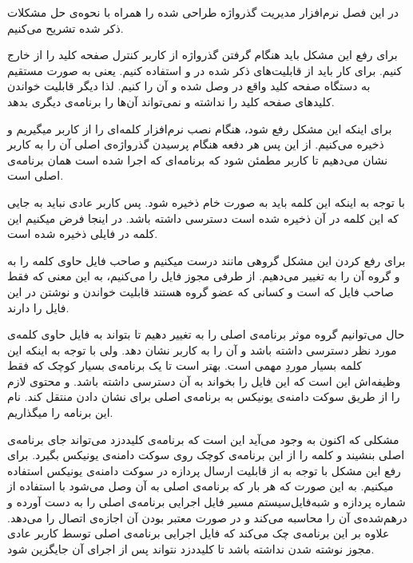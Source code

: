 
در این فصل نرم‌افزار مدیریت گذرواژه طراحی شده را همراه با نحوه‌ی حل مشکلات ذکر شده تشریح می‌کنیم.


برای رفع این مشکل باید هنگام گرفتن گذرواژه از کاربر کنترل صفحه کلید را از  خارج کنیم. برای کار باید از قابلیت‌های ذکر شده در  و   استفاده کنیم. یعنی به صورت مستقیم به دستگاه صفحه کلید واقع در  وصل شده و آن را  کنیم. لذا دیگر  قابلیت خواندن کلید‌های صفحه کلید را نداشته و نمی‌تواند آن‌ها را برنامه‌ی دیگری بدهد.


برای اینکه این مشکل رفع شود، هنگام نصب نرم‌افزار کلمه‌ای را از کاربر میگیریم و ذخیره می‌کنیم. از این پس هر دفعه هنگام پرسیدن گذرواژه‌ی اصلی آن را به کاربر نشان می‌دهیم تا کاربر مطمئن شود که برنامه‌ای که اجرا شده است همان برنامه‌ی اصلی است.

با توجه به اینکه این کلمه باید به صورت خام ذخیره شود. پس کاربر عادی نباید به جایی که این کلمه در آن ذخیره شده است دسترسی داشته باشد. در اینجا فرض میکنیم این کلمه در فایلی ذخیره شده است. 

برای رفع کردن این مشکل گروهی مانند  درست میکنیم و صاحب فایل حاوی کلمه را به  و گروه آن را به  تغییر می‌دهیم. از طرفی مجوز فایل را   می‌کنیم، به این معنی که فقط صاحب فایل که  است و کسانی که عضو گروه  هستند قابلیت خواندن و نوشتن در این فایل را دارند. 

حال می‌توانیم گروه موثر برنامه‌ی اصلی را به  تغییر دهیم تا بتواند به فایل حاوی کلمه‌ی مورد نظر دسترسی داشته باشد و آن را به کاربر نشان دهد. ولی با توجه به اینکه این کلمه بسیار موردِ مهمی است. بهتر است تا یک برنامه‌ی بسیار کوچک که فقط وظیفه‌اش این است که این فایل را بخواند به آن دسترسی داشته باشد. و محتوی لازم را از طریق سوکت دامنه‌ی یونیکس به برنامه‌ی اصلی برای نشان دادن منتقل کند. نام این برنامه را  میگذاریم.

مشکلی که اکنون به وجود می‌آید این است که برنامه‌ی کلیددزد می‌تواند جای برنامه‌ی اصلی بنشیند و کلمه را از این برنامه‌ی کوچک روی سوکت دامنه‌ی یونیکس بگیرد.
برای رفع این مشکل با توجه به  از قابلیت ارسال  پردازه در سوکت دامنه‌ی یونیکس استفاده میکنیم. به این صورت که  هر بار که برنامه‌ی اصلی به آن وصل می‌شود با استفاده از شماره پردازه و شبه‌فایل‌سیستم  مسیر فایل اجرایی برنامه‌ی اصلی را به دست آورده و درهم‌شده‌ی آن را محاسبه می‌کند و در صورت معتبر بودن آن اجازه‌ی اتصال را می‌دهد. علاوه بر این برنامه‌ی  چک می‌کند که فایل اجرایی برنامه‌ی اصلی توسط کاربر عادی مجوز نوشته شدن نداشته باشد تا کلیددزد نتواند پس از اجرای آن جایگزین شود.

